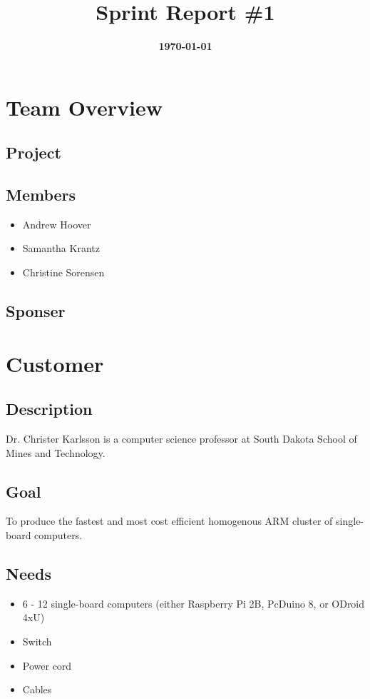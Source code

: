 \documentclass{article}
\title{\normalfont\Large\bfseries\color{TitleColor}Sprint Report \#1}
\date{\normalfont\bfseries\color{TitleColor}\today}
\begin{document}
\maketitle

\section*{Team Overview}
\subsection*{Project}

\subsection*{Members}
\begin{itemize}
	\item Andrew Hoover
	\item Samantha Krantz
	\item Christine Sorensen
\end{itemize}

\subsection*{Sponser}

\section*{Customer}
\subsection*{Description}
Dr. Christer Karlsson is a computer science professor at South Dakota School of Mines and Technology.
\subsection*{Goal}
To produce the fastest and most cost efficient homogenous ARM cluster of single-board computers.
\subsection*{Needs}
\begin{itemize}
	\item 6 - 12 single-board computers (either Raspberry Pi 2B, PcDuino 8, or ODroid 4xU)
	\item Switch
	\item Power cord
	\item Cables
\end{itemize}
\end{document}
